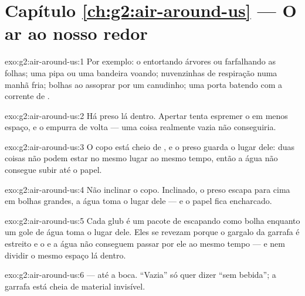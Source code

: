 \section*{Capítulo \ref{ch:g2:air-around-us} --- O ar ao nosso redor}

\begin{solution}{exo:g2:air-around-us:1}
Por exemplo: o  entortando árvores ou farfalhando as folhas; uma
pipa ou uma bandeira voando; nuvenzinhas de respiração numa manhã
fria; bolhas ao assoprar por um canudinho; uma porta batendo com a
corrente de .
\end{solution}

\begin{solution}{exo:g2:air-around-us:2}
Há  preso lá dentro. Apertar tenta espremer o  em menos espaço, e
o  empurra de volta --- uma coisa realmente vazia não conseguiria.
\end{solution}

\begin{solution}{exo:g2:air-around-us:3}
O copo está cheio de , e o  preso guarda o lugar dele: duas
coisas não podem estar no mesmo lugar ao mesmo tempo, então a água
não consegue subir até o papel.
\end{solution}

\begin{solution}{exo:g2:air-around-us:4}
Não inclinar o copo. Inclinado, o  preso escapa para cima em bolhas
grandes, a água toma o lugar dele --- e o papel fica encharcado.
\end{solution}

\begin{solution}{exo:g2:air-around-us:5}
Cada glub é um pacote de  escapando como bolha enquanto um gole de
água toma o lugar dele. Eles se revezam porque o gargalo da garrafa é
estreito e o  e a água não conseguem passar por ele ao mesmo tempo
--- e nem dividir o mesmo espaço lá dentro.
\end{solution}

\begin{solution}{exo:g2:air-around-us:6}
 --- até a boca. ``Vazia'' só quer dizer ``sem bebida''; a garrafa
está cheia de material invisível.
\end{solution}

